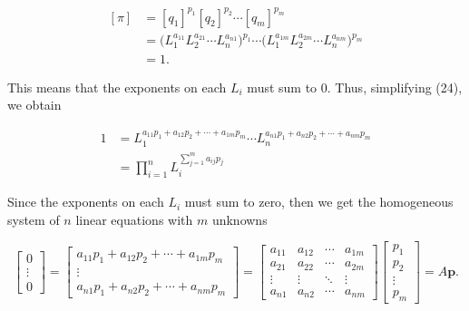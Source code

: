 \documentclass{article}
\theoremstyle{definition}
\theoremstyle{remark}
\theoremstyle{definition}
\begin{document}
\begin{equation}
    \begin{split}
        [\pi] &= [q_1]^{p_1}[q_2]^{p_2}\cdots[q_m]^{p_m} \\
        &= \big(L_1^{a_{11}}L_2^{a_{21}}\cdots L_n^{a_{n1}}\big)^{p_1}\cdots\big(L_1^{a_{1m}}L_2^{a_{2m}}\cdots L_n^{a_{nm}}\big)^{p_m} \\
        &= 1.
    \end{split}
\end{equation}

\noindent This means that the exponents on each $L_i$ must sum to 0. Thus, simplifying (24), we obtain 

\begin{equation}
    \begin{split}
        1 &= L_1^{a_{11}p_1+a_{12}p_2+\cdots+a_{1m}p_m}\cdots L_n^{a_{n1}p_1+a_{n2}p_2+\cdots+a_{nm}p_m} \\
        &= \prod_{i=1}^{n}L_i^{\sum_{j=1}^{m}a_{ij}p_j}
    \end{split}
\end{equation}


\noindent Since the exponents on each $L_i$ must sum to zero, then we get the
homogeneous system of $n$ linear equations with $m$ unknowns

\begin{equation*}
    \begin{bmatrix} 0 \\ \vdots \\ 0\end{bmatrix} = \begin{bmatrix} a_{11}p_1+a_{12}p_2+\cdots+a_{1m}p_m \\ \vdots \\ a_{n1}p_1+a_{n2}p_2+\cdots+a_{nm}p_m\end{bmatrix}=\begin{bmatrix} a_{11} & a_{12} &\cdots&a_{1m} \\ a_{21} & a_{22} & \cdots & a_{2m} \\ \vdots & \vdots & \ddots & \vdots \\ a_{n1} & a_{n2} & \cdots & a_{nm} \end{bmatrix}  \begin{bmatrix} p_1 \\ p_2 \\ \vdots \\ p_m \end{bmatrix} = A\mathbf{p}. 
\end{equation*}
\end{document}
